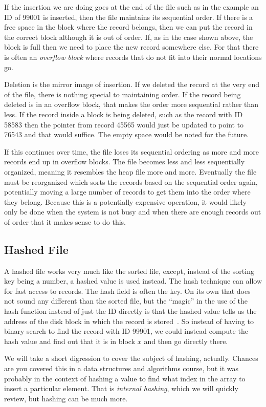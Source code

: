 If the insertion we are doing goes at the end of the file such as in the example an ID of 99001 is inserted, then the file maintains its sequential order. If there is a free space in the block where the record belongs, then we can put the record in the correct block although it is out of order. If, as in the case shown above, the block is full then we need to place the new record somewhere else. For that there is often an \textit{overflow block} where records that do not fit into their normal locations go. 

Deletion is the mirror image of insertion. If we deleted the record at the very end of the file, there is nothing special to maintaining order. If the record being deleted is in an overflow block, that makes the order more sequential rather than less. If the record inside a block is being deleted, such as the record with ID 58583 then the pointer from record 45565 would just be updated to point to 76543 and that would suffice. The empty space would be noted for the future. 

If this continues over time, the file loses its sequential ordering as more and more records end up in overflow blocks. The file becomes less and less sequentially organized, meaning it resembles the heap file more and more. Eventually the file must be reorganized which sorts the records based on the sequential order again, potentially moving a large number of records to get them into the order where they belong. Because this is a potentially expensive operation, it would likely only be done when the system is not busy and when there are enough records out of order that it makes sense to do this. 

\subsection*{Hashed File}

A hashed file works very much like the sorted file, except, instead of the sorting key being a number, a hashed value is used instead. The hash technique can allow for fast access to records. The hash field is often the key. On its own that does not sound any different than the sorted file, but the ``magic'' in the use of the hash function instead of just the ID directly is that the hashed value tells us the address of the disk block in which the record is stored~\cite{fds}. So instead of having to binary search to find the record with ID 99901, we could instead compute the hash value and find out that it is in block $x$ and then go directly there.

We will take a short digression to cover the subject of hashing, actually. Chances are you covered this in a data structures and algorithms course, but it was probably in the context of hashing a value to find what index in the array to insert a particular element. That is \textit{internal hashing}, which we will quickly review, but hashing can be much more.





